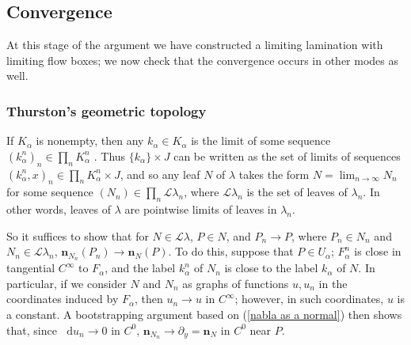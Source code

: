 \documentclass[reqno,11pt]{amsart}
\newcommand*\dif{\mathop{}\!\mathrm{d}}
\newcommand{\Leaves}{\mathscr L}
\newcommand{\normal}{\mathbf n}
\theoremstyle{definition}
\numberwithin{equation}{section}
\begin{document}
\subsection{Convergence}
At this stage of the argument we have constructed a limiting lamination with limiting flow boxes; we now check that the convergence occurs in other modes as well.

\subsubsection{Thurston's geometric topology}
If $K_\alpha$ is nonempty, then any $k_\alpha \in K_\alpha$ is the limit of some sequence $(k_\alpha^n)_n \in \prod_n K_\alpha^n$ \cite[Theorem 4.11]{nadler2017continuum}.
Thus $\{k_\alpha\} \times J$ can be written as the set of limits of sequences $(k_\alpha^n, x)_n \in \prod_n K_\alpha^n \times J$, and so any leaf $N$ of $\lambda$ takes the form $N = \lim_{n \to \infty} N_n$ for some sequence $(N_n) \in \prod_n \Leaves \lambda_n$, where $\Leaves \lambda_n$ is the set of leaves of $\lambda_n$.
In other words, leaves of $\lambda$ are pointwise limits of leaves in $\lambda_n$.

So it suffices to show that for $N \in \Leaves \lambda$, $P \in N$, and $P_n \to P$, where $P_n \in N_n$ and $N_n \in \Leaves \lambda_n$, $\normal_{N_n}(P_n) \to \normal_N(P)$.
To do this, suppose that $P \in U_\alpha$; $F_\alpha^n$ is close in tangential $C^\infty$ to $F_\alpha$, and the label $k^n_\alpha$ of $N_n$ is close to the label $k_\alpha$ of $N$.
In particular, if we consider $N$ and $N_n$ as graphs of functions $u, u_n$ in the coordinates induced by $F_\alpha$, then $u_n \to u$ in $C^\infty$; however, in such coordinates, $u$ is a constant.
A bootstrapping argument based on (\ref{nabla as a normal}) then shows that, since $\dif u_n \to 0$ in $C^0$, $\normal_{N_n} \to \partial_y = \normal_N$ in $C^0$ near $P$.
\end{document}
